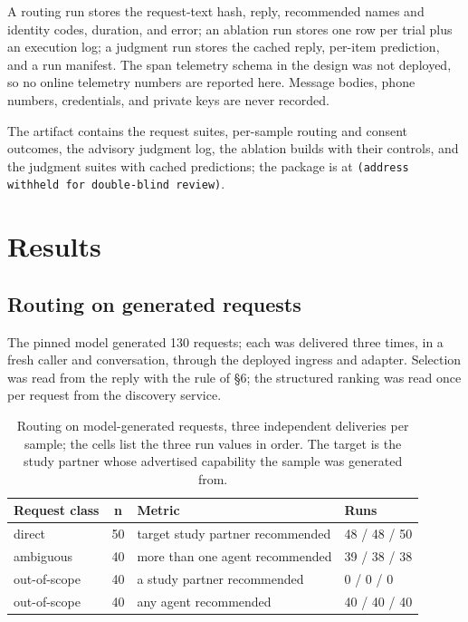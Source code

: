 \documentclass[runningheads,a4paper]{llncs}
\begin{document}
A routing run stores the request-text hash, reply, recommended names and identity codes, duration, and error; an ablation run stores one row per trial plus an execution log; a judgment run stores the cached reply, per-item prediction, and a run manifest. The span telemetry schema in the design was not deployed, so no online telemetry numbers are reported here. Message bodies, phone numbers, credentials, and private keys are never recorded.

The artifact contains the request suites, per-sample routing and consent outcomes, the advisory judgment log, the ablation builds with their controls, and the judgment suites with cached predictions; the package is at \texttt{(address withheld for double-blind review)}.

\section{Results}

\subsection{Routing on generated requests}

The pinned model generated 130 requests; each was delivered three times, in a fresh caller and conversation, through the deployed ingress and adapter. Selection was read from the reply with the rule of §6; the structured ranking was read once per request from the discovery service.

\begin{table}[htbp]

\centering

\small

\caption{Routing on model-generated requests, three independent deliveries per sample; the cells list the three run values in order. The target is the study partner whose advertised capability the sample was generated from.}\label{tab:4}

\begin{tabularx}{\textwidth}{@{}lcXp{2.6cm}@{}}

\toprule

\textbf{Request class} & \textbf{n} & \textbf{Metric} & \textbf{Runs} \\

\midrule

direct & 50 & target study partner recommended & 48 / 48 / 50 \\

ambiguous & 40 & more than one agent recommended & 39 / 38 / 38 \\

out-of-scope & 40 & a study partner recommended & 0 / 0 / 0 \\

out-of-scope & 40 & any agent recommended & 40 / 40 / 40 \\

\bottomrule

\end{tabularx}

\end{table}
\end{document}
